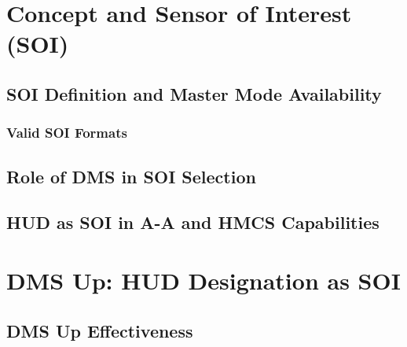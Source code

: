 \documentclass[11pt, a4paper, twoside]{report}
\begin{document}
\section{Concept and Sensor of Interest (SOI)}

\subsection{SOI Definition and Master Mode Availability}

\subsubsection{Valid SOI Formats}

\subsection{Role of DMS in SOI Selection}

\subsection{HUD as SOI in A-A and HMCS Capabilities}

\section{DMS Up: HUD Designation as SOI}

\subsection{DMS Up Effectiveness}
\end{document}

